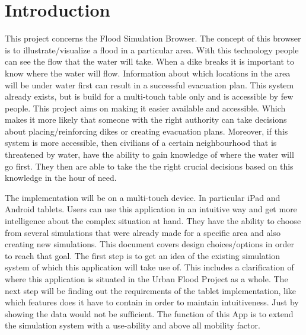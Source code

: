 
\section{Introduction}
This project concerns the Flood Simulation Browser. The concept of this browser is to illustrate/visualize a flood in a particular area. With this technology people can see the flow that the water will take. When a dike breaks it is important to know where the water will flow. Information about which locations in the area will be under water first can result in a successful evacuation plan. This system already exists, but is build for a multi-touch table only and is accessible by few people. This project aims on making it easier available and accessible. Which makes it more likely that someone with the right authority can take decisions about placing/reinforcing dikes or creating evacuation plans. Moreover, if this system is more accessible, then civilians of a certain neighbourhood that is threatened by water, have the ability to gain knowledge of where the water will go first. They then are able to take the the right crucial decisions based on this knowledge in the hour of need.

The implementation will be on a multi-touch device. In particular iPad and Android tablets. Users can use this application in an intuitive way and get more intelligence about the complex situation at hand. They have the ability to choose from several simulations that were already made for a specific area and also creating new simulations.
This document covers design choices/options in order to reach that goal. The first step is to get an idea of the existing simulation system of which this application will take use of. This includes a clarification of where this application is situated in the Urban Flood Project as a whole. The next step will be finding out the requirements of the tablet implementation, like which features does it have to contain in order to maintain intuitiveness. Just by showing the data would not be sufficient. The function of this App is to extend the simulation system with a use-ability and above all mobility factor.

